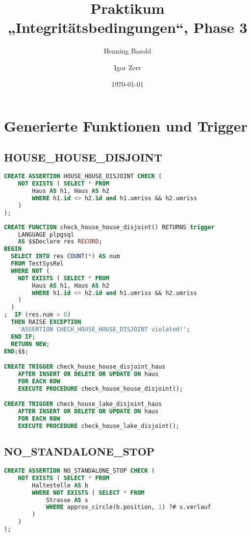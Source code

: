 \documentclass[a4paper]{article}
\title{Praktikum „Integritätsbedingungen“, Phase 3}
\author{Henning Basold \and Igor Zerr}
\date{\today}
\begin{document}
\maketitle

\section{Generierte Funktionen und Trigger}

\subsection{HOUSE\_HOUSE\_DISJOINT}
\begin{lstlisting}[language=sql]
CREATE ASSERTION HOUSE_HOUSE_DISJOINT CHECK (
    NOT EXISTS ( SELECT * FROM
        Haus AS h1, Haus AS h2
        WHERE h1.id <> h2.id and h1.umriss && h2.umriss
    )
);
\end{lstlisting}

\begin{lstlisting}[language=sql]
CREATE FUNCTION check_house_house_disjoint() RETURNS trigger
    LANGUAGE plpgsql
    AS $$Declare res RECORD;
BEGIN
  SELECT INTO res COUNT(*) AS num
  FROM TestSysRel
  WHERE NOT (
    NOT EXISTS ( SELECT * FROM
        Haus AS h1, Haus AS h2
        WHERE h1.id <> h2.id and h1.umriss && h2.umriss
    )
  )
;  IF (res.num > 0)
  THEN RAISE EXCEPTION
    'ASSERTION CHECK_HOUSE_HOUSE_DISJOINT violated!';
  END IF;
  RETURN NEW;
END;$$;

CREATE TRIGGER check_house_house_disjoint_haus
    AFTER INSERT OR DELETE OR UPDATE ON haus
    FOR EACH ROW
    EXECUTE PROCEDURE check_house_house_disjoint();

CREATE TRIGGER check_house_lake_disjoint_haus
    AFTER INSERT OR DELETE OR UPDATE ON haus
    FOR EACH ROW
    EXECUTE PROCEDURE check_house_lake_disjoint();

\end{lstlisting}

\subsection{NO\_STANDALONE\_STOP}
\begin{lstlisting}[language=sql]
CREATE ASSERTION NO_STANDALONE_STOP CHECK (
    NOT EXISTS ( SELECT * FROM
        Haltestelle AS b
        WHERE NOT EXISTS ( SELECT * FROM
            Strasse AS s
            WHERE approx_circle(b.position, 1) ?# s.verlauf
        )
    )
);
\end{lstlisting}
\end{document}
